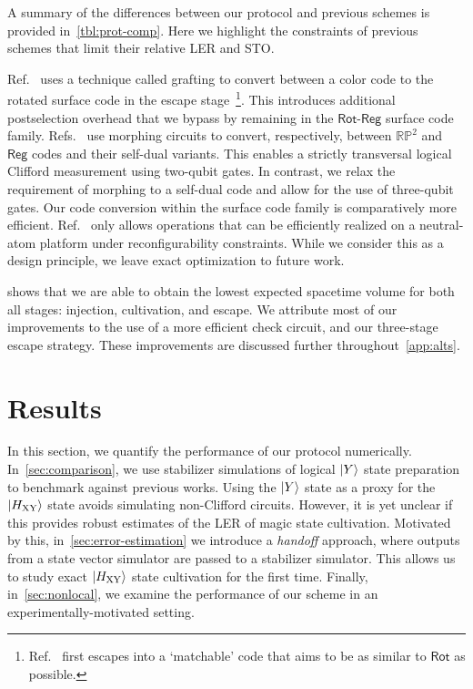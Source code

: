 \documentclass[%
    aps, 
    physrev,
    reprint,
]{revtex4-2}
\newcommand{\XY}{_\mathrm{XY}}
\begin{document}
A summary of the differences between our protocol and previous schemes is provided in~\cref{tbl:prot-comp}. 
Here we highlight the constraints of previous schemes that limit their relative
LER and STO.

Ref.~\cite{gidney2024magic} uses a technique called grafting to convert between a color code to the rotated surface code in the escape stage~\footnote{Ref.~\cite{gidney2024magic} first escapes into a `matchable' code that aims to be as similar to $\mathsf{Rot}$ as possible.}. 
This introduces additional postselection overhead that we bypass by remaining in the $\mathsf{Rot}$-$\mathsf{Reg}$ surface code family.
Refs.~\cite{chen2025efficient,claes2025cultivatingtstatessurface} use morphing circuits to convert, respectively, between $\mathbb{RP}^2$ and $\mathsf{Reg}$ codes and their self-dual variants.
This enables a strictly transversal logical Clifford measurement using two-qubit gates. 
In contrast, we relax the requirement of morphing to a self-dual code and allow for the use of three-qubit gates. 
Our code conversion within the surface code family is {comparatively} more efficient. 
Ref.~\cite{claes2025cultivatingtstatessurface} only allows operations that can be efficiently realized on a neutral-atom platform under reconfigurability constraints. While we consider this as a design principle, we leave exact optimization to future work. 

{ shows that we are able to obtain the lowest expected spacetime volume for both all stages: injection, cultivation, and escape.}
We attribute most of our improvements to the use of a more efficient check circuit, 
and our three-stage escape strategy.
These improvements are discussed further throughout~\cref{app:alts}.


\section{Results}\label{sec:results}

In this section, we quantify the performance of our protocol numerically. 
In~\cref{sec:comparison}, we use 
stabilizer simulations of logical $\ket{Y}$ state preparation to benchmark against previous works. 
Using the $\ket{Y}$ state as a proxy for the $\ket{H\XY}$ state avoids simulating non-Clifford circuits. 
However, it is yet unclear if this provides robust estimates of the LER of magic state cultivation. 
Motivated by this, in~\cref{sec:error-estimation} we introduce a \textit{handoff} approach, where outputs from a state vector simulator are passed to a stabilizer simulator. 
This allows us to study exact $\ket{H\XY}$ state cultivation for the first time.
Finally, in~\cref{sec:nonlocal}, we examine the performance of our scheme in an experimentally-motivated setting.
\end{document}
